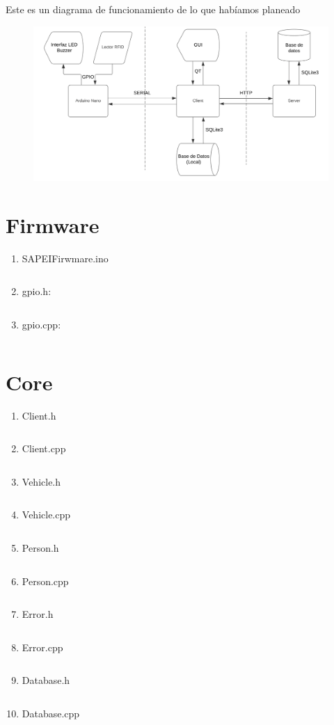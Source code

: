\documentclass[a4paper, 12pt]{report}
\begin{document}
    Este es un diagrama de funcionamiento de lo que habíamos planeado
    \begin{figure}[h]
        \centering
        \includegraphics[width=1\textwidth]{./image2.png}
    \end{figure}

\newpage
\section{Firmware}
\begin{enumerate}[left=0pt]
    \item SAPEIFirwmare.ino
    \inputminted{c++}{../SAPEIFirmware/SAPEIFirmware.ino}
    \newpage
    \item gpio.h:
    \inputminted{c++}{../SAPEIFirmware/src/lib/gpio.h}
    \item gpio.cpp:
    \inputminted{c++}{../SAPEIFirmware/src/lib/gpio.cpp}
\end{enumerate}

\newpage
\section{Core}
\begin{enumerate}[left=0pt]
    \item Client.h
    \inputminted{c++}{../SAPEICore/Client.h}
    \item Client.cpp
    \inputminted{c++}{../SAPEICore/Client.cpp}
    \newpage
    \item Vehicle.h
    \inputminted{c++}{../SAPEICore/Vehicle.h}
    \item Vehicle.cpp
    \inputminted{c++}{../SAPEICore/Vehicle.cpp}
    \newpage
    \item Person.h
    \inputminted{c++}{../SAPEICore/Person.h}
    \item Person.cpp
    \inputminted{c++}{../SAPEICore/Person.cpp}
    \newpage
    \item Error.h
    \inputminted{c++}{../SAPEICore/Error.h}
    \item Error.cpp
    \inputminted{c++}{../SAPEICore/Error.cpp}
    \newpage
    \item Database.h
    \inputminted{c++}{../SAPEICore/DataBase.h}
    \item Database.cpp
    \inputminted{c++}{../SAPEICore/DataBase.cpp}
\end{enumerate}
\end{document}
